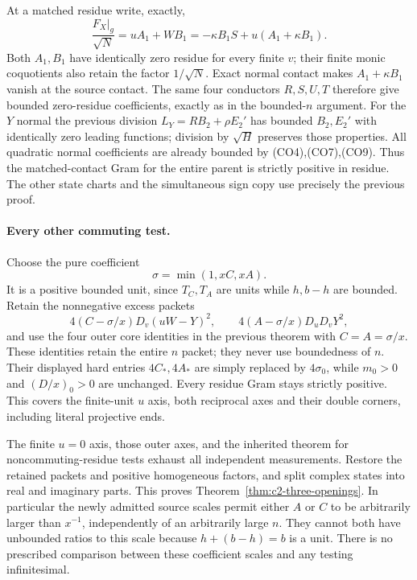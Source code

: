 At a matched residue write, exactly,
\[
 \frac{F_X|_g}{\sqrt N}=uA_1+WB_1
   =-\kappa B_1S+u(A_1+\kappa B_1).
\]
Both $A_1,B_1$ have identically zero residue for every finite $v$;
their finite monic coquotients also retain the factor $1/\sqrt N$.
Exact normal contact makes $A_1+\kappa B_1$ vanish at the source
contact.  The same four conductors $R,S,U,T$ therefore give bounded
zero-residue coefficients, exactly as in the bounded-$n$ argument.
For the $Y$ normal the previous division
$L_Y=RB_2+\rho E_2'$ has bounded $B_2,E_2'$ with identically zero
leading functions; division by $\sqrt H$ preserves those properties.
All quadratic normal coefficients are already bounded by
(CO4),(CO7),(CO9).  Thus the matched-contact Gram for the entire
parent is strictly positive in residue.  The other state charts and
the simultaneous sign copy use precisely the previous proof.

\paragraph{Every other commuting test.}
Choose the pure coefficient
\[
                         \sigma=\min(1,xC,xA).
\]
It is a positive bounded unit, since $T_C,T_A$ are units while
$h,b-h$ are bounded.  Retain the nonnegative excess packets
\[
 4(C-\sigma/x)D_v(uW-Y)^2,
 \qquad4(A-\sigma/x)D_uD_vY^2,
\]
and use the four outer core identities in the previous theorem with
$C=A=\sigma/x$.  These identities retain the entire $n$ packet;
they never use boundedness of $n$.  Their displayed hard entries
$4C_*,4A_*$ are simply replaced by $4\sigma_0$, while $m_0>0$
and $(D/x)_0>0$ are unchanged.  Every residue Gram stays strictly
positive.  This covers the finite-unit $u$ axis, both reciprocal
axes and their double corners, including literal projective ends.

The finite $u=0$ axis, those outer axes, and the inherited theorem for
noncommuting-residue tests exhaust all independent measurements.
Restore the retained packets and positive homogeneous factors, and
split complex states into real and imaginary parts.  This proves
Theorem~\ref{thm:c2-three-openings}.  In particular the newly admitted
source scales permit either $A$ or $C$ to be arbitrarily larger than
$x^{-1}$, independently of an arbitrarily large $n$.  They cannot
both have unbounded ratios to this scale because $h+(b-h)=b$ is a unit.  There is no
prescribed comparison between these coefficient scales and any
testing infinitesimal.
